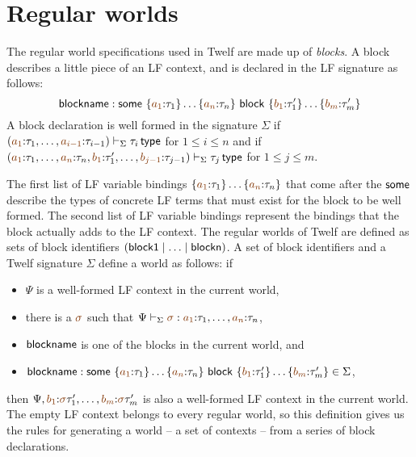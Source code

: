 


\section{Regular worlds}
\label{sec:gen-worlds}

The regular world specifications used in Twelf are made up of {\it
  blocks}. A block describes a little piece of an LF context, and
is declared in the LF signature as follows:
\[
 {\sf blockname} :
 {\sf some}~\{\lf{a_1}{:}\tau_1\}\ldots\{\lf{a_n}{:}\tau_n\}
~{\sf block}~\{\lf{b_1}{:}\tau'_1\}\ldots\{\lf{b_m}{:}\tau'_m\}
\]
A block declaration is well formed in the signature $\Sigma$ if 
$\left(\lf{a_1}{:}\tau_1,\ldots,\lf{a_{i-1}}{:} \tau_{i-1} \right)\vdash_\Sigma
\tau_i \,{\sf type}$ for $1 \leq i \leq n$ and if 
$\left(\lf{a_1}{:}\tau_1,\ldots,\lf{a_{n}}{:} \tau_{n},
 \lf{b_1}{:}\tau'_1,\ldots,\lf{b_{j-1}}{:}\tau_{j-1}\right) \vdash_\Sigma
\tau_j \,{\sf type}$ for $1 \leq j \leq m$. 

The first list of LF variable bindings
$\{\lf{a_1}{:}\tau_1\}\ldots\{\lf{a_n}{:}\tau_n\}$ that 
come after the ${\sf some}$ describe the types
of concrete LF terms that must exist for the block to be well formed.
The second list of LF variable bindings represent the bindings that
the block actually adds to the LF context. The regular worlds of 
Twelf are defined as sets of block identifiers 
$({\sf block1} \mid \ldots \mid {\sf blockn})$. A set of block identifiers
and a Twelf signature $\Sigma$ define a world as follows: if
\smallskip
\begin{itemize}
\item $\Psi$ is a well-formed
LF context in the current world, 
\item there is a $\lf{\sigma}$ such that
$\Psi \vdash_\Sigma \lf{\sigma} :
\lf{a_1}{:}\tau_1,\ldots,\lf{a_n}{:}\tau_n$, 
\item ${\sf blockname}$ is one of the blocks in the current world, and
\item ${\sf blockname} :
 {\sf some}~\{\lf{a_1}{:}\tau_1\}\ldots\{\lf{a_n}{:}\tau_n\}
~{\sf block}~\{\lf{b_1}{:}\tau'_1\}\ldots\{\lf{b_m}{:}\tau'_m\} \in \Sigma$,
\end{itemize}
\smallskip
then $\Psi,
\lf{b_1}{:}\lf\sigma\tau'_1,\ldots, \lf{b_m}{:}\lf\sigma\tau'_m$ is
also a well-formed LF context in the current world. The empty LF context
belongs to every regular world, so this definition gives us the rules for 
generating a world -- a set of contexts -- from a series of block 
declarations. 

